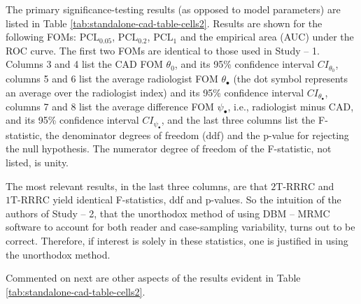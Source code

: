\documentclass[
]{article}
\begin{document}
The primary significance-testing results (as opposed to model parameters) are listed in Table \ref{tab:standalone-cad-table-cells2}. Results are shown for the following FOMs: \(\text{PCL}_{0.05}\), \(\text{PCL}_{0.2}\), \(\text{PCL}_{1}\) and the empirical area (AUC) under the ROC curve. The first two FOMs are identical to those used in Study -- 1. Columns 3 and 4 list the CAD FOM \(\theta_0\), and its 95\% confidence interval \(CI_{\theta_0}\), columns 5 and 6 list the average radiologist FOM \(\theta_{\bullet}\) (the dot symbol represents an average over the radiologist index) and its 95\% confidence interval \(CI_{\theta_{\bullet}}\), columns 7 and 8 list the average difference FOM \(\psi_{\bullet}\), i.e., radiologist minus CAD, and its 95\% confidence interval \(CI_{\psi_{\bullet}}\), and the last three columns list the F-statistic, the denominator degrees of freedom (ddf) and the p-value for rejecting the null hypothesis. The numerator degree of freedom of the F-statistic, not listed, is unity.

The most relevant results, in the last three columns, are that \(\text{2T-RRRC}\) and \(\text{1T-RRRC}\) yield identical F-statistics, ddf and p-values. So the intuition of the authors of Study -- 2, that the unorthodox method of using DBM -- MRMC software to account for both reader and case-sampling variability, turns out to be correct. Therefore, if interest is solely in these statistics, one is justified in using the unorthodox method.

Commented on next are other aspects of the results evident in Table \ref{tab:standalone-cad-table-cells2}.
\end{document}
